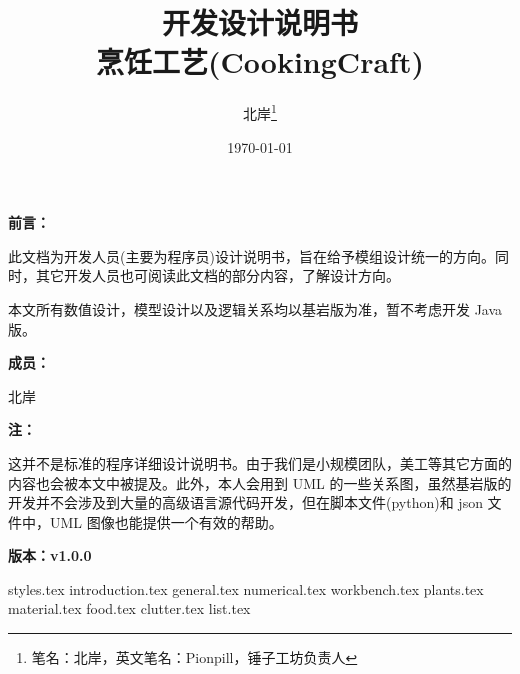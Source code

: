 \documentclass{PionpillNote-book}
\title{\Huge{开发设计说明书} \\ \large{烹饪工艺(CookingCraft)}}
\author{
    北岸\footnote{笔名：北岸，英文笔名：Pionpill，锤子工坊负责人}
}
\date{\today}
\begin{document}
\maketitle                  %

\vspace{2cm}
\noindent\textbf{前言：}

此文档为开发人员(主要为程序员)设计说明书，旨在给予模组设计统一的方向。同时，其它开发人员也可阅读此文档的部分内容，了解设计方向。

本文所有数值设计，模型设计以及逻辑关系均以基岩版为准，暂不考虑开发 Java 版。

\noindent\textbf{成员：}

北岸

\noindent\textbf{注：}

这并不是标准的程序详细设计说明书。由于我们是小规模团队，美工等其它方面的内容也会被本文中被提及。此外，本人会用到 UML 的一些关系图，虽然基岩版的开发并不会涉及到大量的高级语言源代码开发，但在脚本文件(python)和 json 文件中，UML 图像也能提供一个有效的帮助。

\hfill \textbf{版本：v1.0.0}


\newpage
\tableofcontents            %
\thispagestyle{empty}
\newpage
\setcounter{page}{1}

{styles.tex}
{introduction.tex}
{general.tex}
{numerical.tex}
{workbench.tex}
{plants.tex}
{material.tex}
{food.tex}
{clutter.tex}
{list.tex}

\end{document}

